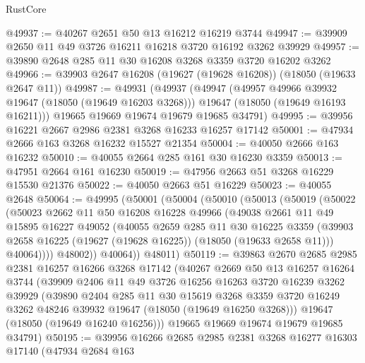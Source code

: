 \begin{lexlean}{RustCore}
\begin{coremodule}
@49937 := @40267 @2651 @50 @13 @16212 @16219 @3744
@49947 := @39909 @2650 @11 @49 @3726 @16211 @16218 @3720 @16192 @3262 @39929
@49957 := @39890 @2648 @285 @11 @30 @16208 @3268 @3359 @3720 @16202 @3262
@49966 := @39903 @2647 @16208 (@19627 (@19628 @16208)) (@18050 (@19633 @2647 @11))
@49987 := @49931
    (@49937
      (@49947
        (@49957 @49966 @39932 @19647 (@18050 (@19649 @16203 @3268)))
        @19647
        (@18050 (@19649 @16193 @16211)))
      @19665
      @19669
      @19674
      @19679
      @19685
      @34791)
@49995 := @39956 @16221 @2667 @2986 @2381 @3268 @16233 @16257 @17142
@50001 := @47934 @2666 @163 @3268 @16232 @15527 @21354
@50004 := @40050 @2666 @163 @16232
@50010 := @40055 @2664 @285 @161 @30 @16230 @3359
@50013 := @47951 @2664 @161 @16230
@50019 := @47956 @2663 @51 @3268 @16229 @15530 @21376
@50022 := @40050 @2663 @51 @16229
@50023 := @40055 @2648
@50064 := @49995
    (@50001
      (@50004
        (@50010
          (@50013
            (@50019
              (@50022
                (@50023
                  @2662
                  @11
                  @50
                  @16208
                  @16228
                  @49966
                  (@49038
                    @2661
                    @11
                    @49
                    @15895
                    @16227
                    @49052
                    (@40055
                      @2659
                      @285
                      @11
                      @30
                      @16225
                      @3359
                      (@39903 @2658 @16225 (@19627 (@19628 @16225)) (@18050 (@19633 @2658 @11)))
                      @40064))))
              @48002))
          @40064))
      @48011)
@50119 := @39863
    @2670
    @2685
    @2985
    @2381
    @16257
    @16266
    @3268
    @17142
    (@40267
      @2669
      @50
      @13
      @16257
      @16264
      @3744
      (@39909
        @2406
        @11
        @49
        @3726
        @16256
        @16263
        @3720
        @16239
        @3262
        @39929
        (@39890
          @2404
          @285
          @11
          @30
          @15619
          @3268
          @3359
          @3720
          @16249
          @3262
          @48246
          @39932
          @19647
          (@18050 (@19649 @16250 @3268)))
        @19647
        (@18050 (@19649 @16240 @16256)))
      @19665
      @19669
      @19674
      @19679
      @19685
      @34791)
@50195 := @39956
    @16266
    @2685
    @2985
    @2381
    @3268
    @16277
    @16303
    @17140
    (@47934
      @2684
      @163

\end{coremodule}
\end{lexlean}
